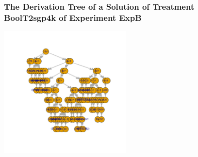  \begin{frame}
 \frametitle{ The Derivation Tree of a Solution of Treatment BoolT2sgp4k of Experiment ExpB }
 \begin{center}
\includegraphics[width=0.5\textwidth, angle=0]
{ExpBDerivationTreeFigure012.pdf}
 \end{center}
 \label{report/ExpBDerivationTreeFigure012.pdf}  
 \end{frame}

